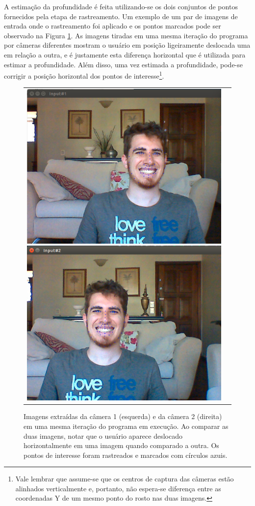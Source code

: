 A estimação da profundidade é feita utilizando-se os dois conjuntos de pontos fornecidos pela etapa de rastreamento. Um exemplo de um par de imagens de entrada onde o rastreamento foi aplicado e os pontos marcados pode ser observado na Figura \ref{fig:input_images}. As imagens tiradas em uma mesma iteração do programa por câmeras diferentes mostram o usuário em posição ligeiramente deslocada uma em relação a outra, e é justamente esta diferença horizontal que é utilizada para estimar a profundidade. Além disso, uma vez estimada a profundidade, pode-se corrigir a posição horizontal dos pontos de interesse\footnote{Vale lembrar que assume-se que os centros de captura das câmeras estão alinhados verticalmente e, portanto, não espera-se diferença entre as coordenadas Y de um mesmo ponto do rosto nas duas imagens.}.

\begin{figure}[!htb]
   \centering
\begin{tabular}{cc}
  \includegraphics[width=0.45\linewidth]{./figs/TG_input_image1.png}
  \includegraphics[width=0.45\linewidth]{./figs/TG_input_image2.png}
  
\end{tabular}
  \caption{ Imagens extraídas da câmera 1 (esquerda) e da câmera 2 (direita) em uma mesma iteração do programa em execução. Ao comparar as duas imagens, notar que o usuário aparece deslocado horizontalmente em uma imagem quando comparado a outra. Os pontos de interesse foram rastreados e marcados com círculos azuis.}

\label{fig:input_images}
\end{figure}

